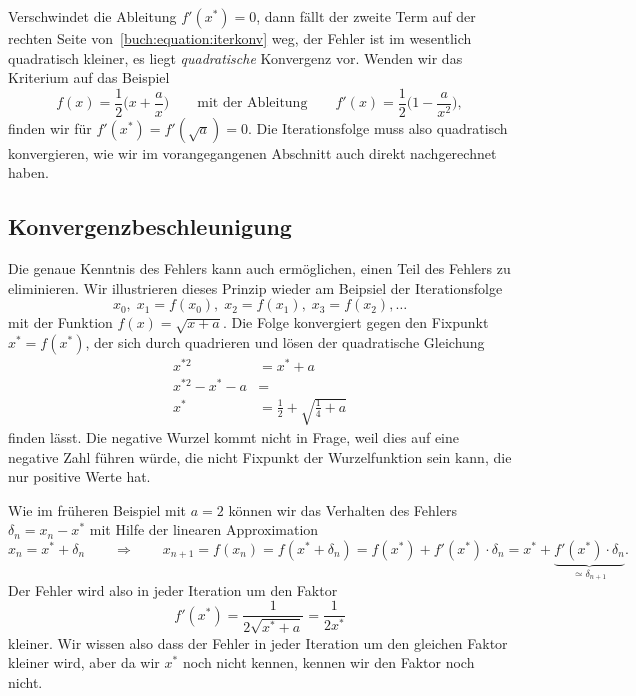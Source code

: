 Verschwindet die Ableitung $f'(x^*)=0$, dann fällt der zweite Term
auf der rechten Seite von~\eqref{buch:equation:iterkonv} weg, der
Fehler ist im wesentlich quadratisch kleiner, es liegt {\em quadratische}
Konvergenz vor.
Wenden wir das Kriterium auf das Beispiel 
\[
f(x) = \frac12\biggl( x + \frac{a}{x}\biggr)
\qquad\text{mit der Ableitung}\qquad
f'(x) = \frac12\biggl( 1 -\frac{a}{x^2}\biggr),
\]
finden wir für $f'(x^*)=f'(\sqrt{a}) = 0$.
Die Iterationsfolge muss also quadratisch konvergieren, wie wir
im vorangegangenen Abschnitt auch direkt nachgerechnet haben.

\subsection{Konvergenzbeschleunigung
\label{buch:subsection:konvergenzbeschleunigung}}
Die genaue Kenntnis des Fehlers kann auch ermöglichen, einen Teil
des Fehlers zu eliminieren.
Wir illustrieren dieses Prinzip wieder am Beipsiel der Iterationsfolge
\[
x_0,\; x_1=f(x_0),\; x_2=f(x_1),\;x_3=f(x_2),\dots
\]
mit der Funktion $f(x)=\sqrt{x+a}$.
Die Folge konvergiert gegen den Fixpunkt $x^* = f(x^*)$, der
sich durch quadrieren und lösen der quadratische
Gleichung
\begin{align*}
x^{*2} &= x^*+a\\
x^{*2} - x^*-a&=\\
x^* &= \frac12 +\sqrt{\frac14+a}
\end{align*}
finden lässt.
Die negative Wurzel kommt nicht in Frage, weil dies auf eine negative Zahl
führen würde, die nicht Fixpunkt der Wurzelfunktion sein kann, die nur
positive Werte hat.

Wie im früheren Beispiel mit $a=2$ können wir das Verhalten des Fehlers
$\delta_n = x_n-x^*$
mit Hilfe der linearen Approximation
\[
x_n = x^* + \delta_n
\qquad\Rightarrow\qquad
x_{n+1} = f(x_n) = f(x^* + \delta_n) = f(x^*) + f'(x^*)\cdot \delta_n
=
x^* + \underbrace{f'(x^*)\cdot \delta_n}_{\displaystyle\simeq\delta_{n+1}}.
\]
Der Fehler wird also in jeder Iteration um den Faktor
\[
f'(x^*) = \frac1{2\sqrt{x^*+a}}=\frac1{2x^*}
\]
kleiner.
Wir wissen also dass der Fehler in jeder Iteration um den gleichen Faktor
kleiner wird, aber da wir $x^*$ noch nicht kennen, kennen wir den Faktor
noch nicht.

